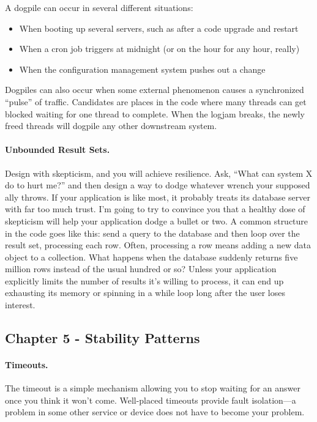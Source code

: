 A dogpile can occur in several different situations:

\begin{itemize}
\item When booting up several servers, such as after a code upgrade and restart
\item When a cron job triggers at midnight (or on the hour for any hour, really)
\item When the configuration management system pushes out a change
\end{itemize}

Dogpiles can also occur when some external phenomenon causes a synchronized “pulse” of traffic. Candidates are places in the code where many threads can get blocked waiting for one thread to complete. When the logjam breaks, the newly freed threads will dogpile any other downstream system.

\paragraph{Unbounded Result Sets.} Design with skepticism, and you will achieve resilience. Ask, “What can system X do to hurt me?” and then design a way to dodge whatever wrench your supposed ally throws. If your application is like most, it probably treats its database server with far too much trust. I’m going to try to convince you that a healthy dose of skepticism will help your application dodge a bullet or two. A common structure in the code goes like this: send a query to the database and then loop over the result set, processing each row. Often, processing a row means adding a new data object to a collection. What happens when the database suddenly returns five million rows instead of the usual hundred or so? Unless your application explicitly limits the number of results it’s willing to process, it can end up exhausting its memory or spinning in a while loop long after the user loses interest.

\subsection{Chapter 5 - Stability Patterns}

\paragraph{Timeouts.} The timeout is a simple mechanism allowing you to stop waiting for an answer once you think it won’t come. Well-placed timeouts provide fault isolation—a problem in some other service or device does not have to become your problem.

